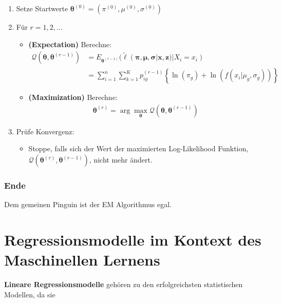 \documentclass[
  ngerman,
]{book}
\providecommand{\tightlist}{%
  \setlength{\itemsep}{0pt}\setlength{\parskip}{0pt}}
\begin{document}
\begin{enumerate}
\def\labelenumi{\arabic{enumi}.}
\item
  Setze Startwerte \(\boldsymbol{\theta}^{(0)}=(\pi^{(0)}, \mu^{(0)}, \sigma^{(0)})\)
\item
  Für \(r=1,2,\dots\)

  \begin{itemize}
  \item
    {\textbf{(Expectation)} } Berechne:
    \begin{align*}
     \mathcal{Q}(\boldsymbol{\theta},\boldsymbol{\theta}^{(r-1)})
     &=E_{\boldsymbol{\theta}^{(r-1)}}(\tilde{\ell}(\boldsymbol{\pi},\boldsymbol{\mu},\boldsymbol{\sigma}|\mathbf{x},\mathbf{z})|X_i=x_i)\\
     &=\sum_{i=1}^n\sum_{k=1}^Kp_{ig}^{(r-1)}\left\{\ln\left(\pi_g\right)+\ln\left(f(x_i|\mu_g,\sigma_g)\right)\right\}
     \end{align*}
  \item
    {\textbf{(Maximization)}} Berechne:
    \begin{align*}
     \boldsymbol{\theta}^{(r)}=\arg\max_{\boldsymbol{\theta}}\mathcal{Q}(\boldsymbol{\theta},\boldsymbol{\theta}^{(r-1)})
     \end{align*}
  \end{itemize}
\item
  Prüfe Konvergenz:

  \begin{itemize}
  \tightlist
  \item
    Stoppe, falls sich der Wert der maximierten Log-Likelihood Funktion, \(\mathcal{Q}(\boldsymbol{\theta}^{(r)},\boldsymbol{\theta}^{(r-1)})\), nicht mehr ändert.
  \end{itemize}
\end{enumerate}

\hypertarget{ende}{%
\subsection*{Ende}\label{ende}}

Dem gemeinen Pinguin ist der EM Algorithmus egal.

\hypertarget{ch:RegML}{%
\chapter{Regressionsmodelle im Kontext des Maschinellen Lernens}\label{ch:RegML}}

\textbf{Lineare Regressionsmodelle} gehören zu den erfolgreichsten statistischen Modellen, da sie
\end{document}
